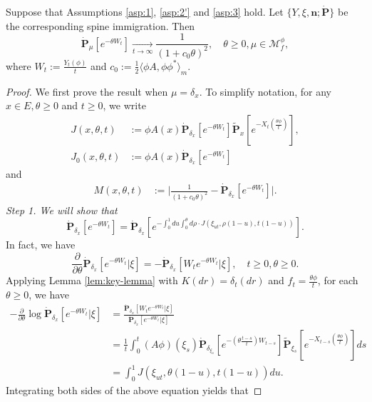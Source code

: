\begin{prop}\label{prop:yaglTheorSpinImmigr}
	Suppose that Assumptions \ref{asp:1}, \ref{asp:2'}  and \ref{asp:3} hold.
	Let $\{Y,\xi,\mathbf n;\dot{\mathbf P}\}$ be the corresponding spine immigration.
	Then
\[
	\dot{\mathbf P}_\mu[e^{-\theta W_t}]
	\xrightarrow[t\to\infty]{}\frac{1}{(1 + c_0 \theta)^2},
	\quad \theta \geq 0,\mu\in \mathcal M^\phi_f,
\]
	where $W_t:= \frac{Y_t(\phi)}{t}$ and $c_0 := \frac {1} {2} \langle \phi  A, \phi \phi^* \rangle_m$.
\end{prop}
\begin{proof}
	We first prove the result when $\mu = \delta_x$.
	To simplify  notation, for any $x\in E,\theta\geq 0$ and $t\geq 0$, we write
\[\begin{split}
	J(x,\theta,t)
	&:=\phi A(x)\dot{\mathbf P}_{\delta_{x}}[e^{-\theta W_t}]\widetilde{\mathbf P}_{x}[e^{-X_t(\frac{\theta\phi}{t})}],\\
	J_0(x,\theta,t)
	&:=\phi A(x)\dot{\mathbf P}_{\delta_x}[e^{-\theta W_t}]
\end{split}\]
	and
\[\begin{split}
	M(x,\theta,t)
	&:=\Big|\frac{1}{(1+c_0\theta)^2}-\dot{\mathbf P}_{\delta_x}[e^{-\theta W_t}]\Big|.
\end{split}\]
	\emph{Step 1.  We will show that}
\begin{equation}\label{eq:yaglTheorSpinImmigrStep1}
	\dot{\mathbf P}_{\delta_x}[e^{-\theta W_t}]
	=\dot{\mathbf P}_{\delta_x}[ e^{-\int_0^1 du\int_0^\theta d\rho\cdot J(\xi_{ut},\rho(1-u),t(1-u))} ].
\end{equation}
	In fact, we have
\[
	\frac{\partial}{\partial \theta}\dot{\mathbf P}_{\delta_x}[e^{-\theta W_t}|\xi]
	= -\dot{\mathbf P}_{\delta_x}[W_te^{-\theta W_t}|\xi],
	\quad t\geq 0,\theta \geq 0.
\]
	Applying Lemma \ref{lem:key-lemma} with $K(dr)=\delta_t(dr)$ and $f_t=\frac{\theta\phi}{t}$, for each $\theta \geq 0$, we have
\[\begin{split}
	-\frac{\partial}{\partial \theta}\log \dot{\mathbf P}_{\delta_x}[e^{-\theta W_t}|\xi]
	&=\frac{\dot{\mathbf P}_{\delta_x} [W_t e^{-\theta W_t}|\xi]}{\dot{\mathbf P}_{\delta_x}[e^{-\theta W_t}|\xi]}\\
	&=\frac{1}{t}\int_0^t  (A\phi)(\xi_s)\dot{\mathbf P}_{\delta_{\xi_s}}[e^{-(\theta \frac{t-s}{t})W_{t-s}}]\widetilde{\mathbf P}_{\xi_s}[e^{-X_{t-s}(\frac{\theta\phi}{t})}]ds\\
	&=\int_0^1 J(\xi_{ut},\theta(1-u),t(1-u)) du.
\end{split}\]
	Integrating both sides of the above equation yields that

\end{proof}
